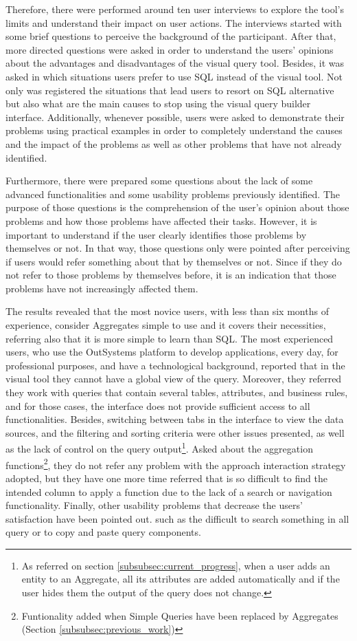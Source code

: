 Therefore, there were performed around ten user interviews to explore the tool's limits and understand their impact on user actions. The interviews started with some brief questions to perceive the background of the participant. After that, more directed questions were asked in order to understand the users' opinions about the advantages and disadvantages of the visual query tool. Besides, it was asked in which situations users prefer to use \gls{SQL} instead of the visual tool. Not only was registered the situations that lead users to resort on \gls{SQL} alternative but also what are the main causes to stop using the visual query builder interface. Additionally, whenever possible, users were asked to demonstrate their problems using practical examples in order to completely understand the causes and the impact of the problems as well as other problems that have not already identified.

Furthermore, there were prepared some questions about the lack of some advanced functionalities and some usability problems previously identified. The purpose of those questions is the comprehension of the user's opinion about those problems and how those problems have affected their tasks. However, it is important to understand if the user clearly identifies those problems by themselves or not. In that way, those questions only were pointed after perceiving if users would refer something about that by themselves or not. Since if they do not refer to those problems by themselves before, it is an indication that those problems have not increasingly affected them.

The results revealed that the most novice users, with less than six months of experience, consider Aggregates simple to use and it covers their necessities, referring also that it is more simple to learn than \gls{SQL}. The most experienced users, who use the OutSystems platform to develop applications, every day, for professional purposes, and have a technological background, reported that in the visual tool they cannot have a global view of the query. Moreover, they referred they work with queries that contain several tables, attributes, and business rules, and for those cases, the interface does not provide sufficient access to all functionalities.  Besides, switching between tabs in the interface to view the data sources, and the filtering and sorting criteria were other issues presented, as well as the lack of control on the query output\footnote{As referred on section \ref{subsubsec:current_progress}, when a user adds an entity to an Aggregate, all its attributes are added automatically and if the user hides them the output of the query does not change.}. Asked about the aggregation functions\footnote{Funtionality added when Simple Queries have been replaced by Aggregates (Section \ref{subsubsec:previous_work})}, they do not refer any problem with the approach interaction strategy adopted, but they have one more time referred that is so difficult to find the intended column to apply a function due to the lack of a search or navigation functionality. Finally, other usability problems that decrease the users’ satisfaction have been pointed out. such as the difficult to search something in all query or to copy and paste query components.

